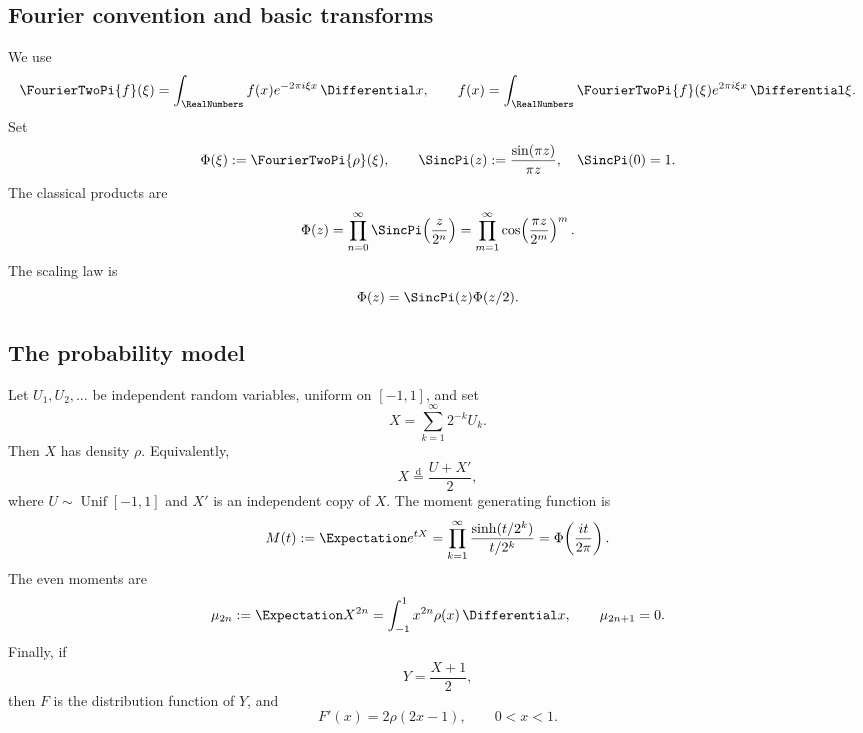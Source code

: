 \documentclass[11pt]{article}
\theoremstyle{definition}
\theoremstyle{remark}
\begin{document}
\subsection{Fourier convention and basic transforms}

We use
\begin{equation}
 \FourierTwoPi{f}(\xi)=\int_{\RealNumbers}f(x)e^{-2\pi i\xi x}\,\Differential x,
 \qquad
 f(x)=\int_{\RealNumbers}\FourierTwoPi{f}(\xi)e^{2\pi i\xi x}\,\Differential\xi.       \label{p6:eq:fourier-convention}
\end{equation}
Set
\begin{equation}
 \Phi(\xi):=\FourierTwoPi{\rho}(\xi),
 \qquad
 \SincPi(z):=\frac{\sin(\pi z)}{\pi z},\quad \SincPi(0)=1. \label{p6:eq:Phi-def}
\end{equation}
The classical products are
\begin{equation}
 \Phi(z)=\prod_{n=0}^{\infty}\SincPi\!\left(\frac{z}{2^n}\right)
 =\prod_{m=1}^{\infty}\cos\!\left(\frac{\pi z}{2^m}\right)^m. \label{p6:eq:Phi-products}
\end{equation}
The scaling law is
\begin{equation}
 \Phi(z)=\SincPi(z)\Phi(z/2).                                \label{p6:eq:Phi-scaling}
\end{equation}

\subsection{The probability model}

Let \(U_1,U_2,\dots\) be independent random variables, uniform on \([-1,1]\), and set
\begin{equation}
 X=\sum_{k=1}^{\infty}2^{-k}U_k.                              \label{p6:eq:X-series}
\end{equation}
Then \(X\) has density \(\rho\).  Equivalently,
\begin{equation}
 X\overset{\mathrm d}=\frac{U+X'}2,                           \label{p6:eq:X-fixed-point}
\end{equation}
where \(U\sim\operatorname{Unif}[-1,1]\) and \(X'\) is an independent copy of \(X\).
The moment generating function is
\begin{equation}
 M(t):=\Expectation e^{tX}
 =\prod_{k=1}^{\infty}\frac{\sinh(t/2^k)}{t/2^k}
 =\Phi\!\left(\frac{it}{2\pi}\right).                       \label{p6:eq:M-product}
\end{equation}
The even moments are
\begin{equation}
 \mu_{2n}:=\Expectation X^{2n}=\int_{-1}^{1}x^{2n}\rho(x)\,\Differential x,
 \qquad \mu_{2n+1}=0.                                      \label{p6:eq:moments}
\end{equation}
Finally, if
\begin{equation}
 Y=\frac{X+1}{2},                                             \label{p6:eq:Y-affine}
\end{equation}
then \(F\) is the distribution function of \(Y\), and
\begin{equation}
 F'(x)=2\rho(2x-1),\qquad 0<x<1.                              \label{p6:eq:F-density}
\end{equation}
\end{document}
